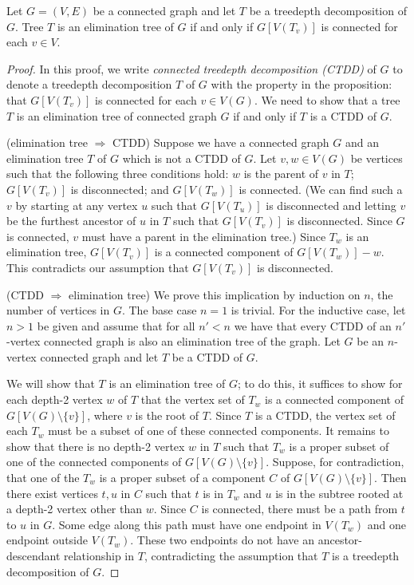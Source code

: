 \begin{proposition}\label{elimination-tree-position}
Let $G=(V,E)$ be a connected graph and let $T$ be a treedepth decomposition of $G$. Tree $T$
is an elimination tree of $G$ if and only if $G[V(T_v)]$ is connected for each $v \in V$.
\end{proposition}

\begin{proof}
In this proof, we write \emph{connected treedepth decomposition (CTDD)} of $G$
to denote a treedepth decomposition $T$ of $G$ with the property in the proposition:
that $G[V(T_v)]$ is
connected for each $v \in V(G)$.  We need to show that a tree $T$ is an
elimination tree of connected graph $G$ if and only if $T$ is a CTDD of $G$.


(elimination tree $\Longrightarrow$ CTDD) Suppose we have a connected graph $G$
and an elimination tree $T$ of $G$ which is not a CTDD of $G$.  Let $v, w \in
V(G)$ be vertices such that the following three conditions hold: $w$ is the
parent of $v$ in $T$; $G[V(T_v)]$ is disconnected; and $G[V(T_w)]$ is
connected.  (We can find such a $v$ by starting at any vertex $u$ such that
$G[V(T_u)]$ is disconnected and letting $v$ be the furthest ancestor of
$u$ in $T$ such that $G[V(T_v)]$ is disconnected.  Since $G$ is connected,
$v$ must have a parent in the elimination tree.)  Since $T_w$ is an elimination
tree, $G[V(T_v)]$ is a connected component of $G[V(T_w)] - w$.   This contradicts
our assumption that $G[V(T_v)]$ is disconnected.

(CTDD $\Longrightarrow$ elimination tree)
We prove this implication by induction on $n$, the number of vertices in $G$.
The base case $n=1$ is trivial.  For the inductive case, let $n>1$ be given
and assume that for all $n' < n$ we have that every CTDD of an $n'$-vertex
connected graph is also an elimination tree of the graph.  Let $G$ be an $n$-vertex
connected graph and let $T$ be a CTDD of $G$.

We will show that $T$ is an elimination tree of $G$; to do this, it suffices
to show for each depth-2 vertex $w$ of $T$ that the vertex set of
$T_w$ is a connected component of $G[V(G)\setminus\{v\}]$, where $v$ is the root of $T$.  Since $T$ is a
CTDD, the vertex set of each $T_w$ must be a subset of one of these connected
components.  It remains to show that there is no depth-2 vertex $w$ in $T$ such
that $T_w$ is a proper subset of one of the connected components of
$G[V(G)\setminus\{v\}]$.  Suppose, for contradiction, that one of the $T_w$ is
a proper subset of a component $C$ of $G[V(G)\setminus\{v\}]$. Then there exist
vertices $t, u$ in $C$ such that $t$ is in $T_w$ and $u$ is in the
subtree rooted at a depth-2 vertex other than $w$.  Since $C$ is
connected, there must be a path from $t$ to $u$ in $G$.  Some edge
along this path must have one endpoint in $V(T_w)$ and one endpoint outside
$V(T_w)$.  These two endpoints do not have an ancestor-descendant relationship
in $T$, contradicting the assumption that $T$ is a treedepth decomposition of
$G$.
\end{proof}

